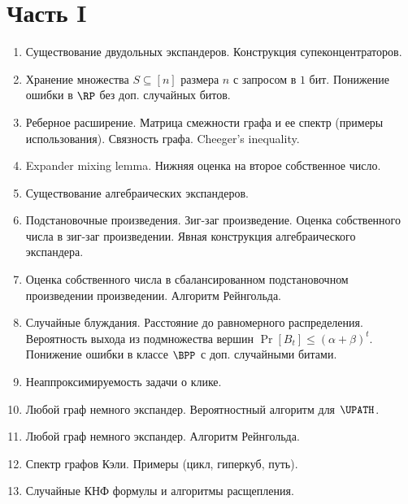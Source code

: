 





\section*{Часть I}
\begin{enumerate}
    \item Существование двудольных экспандеров. Конструкция супеконцентраторов.
    \item Хранение множества $S \subseteq [n]$ размера $n$ с запросом в $1$ бит. Понижение ошибки в $\RP$
        без доп. случайных битов.
    \item Реберное расширение. Матрица смежности графа и ее спектр (примеры использования). Связность
        графа. Cheeger's inequality.
    \item Expander mixing lemma. Нижняя оценка на второе собственное число.
    \item Существование алгебраических экспандеров.
    \item Подстановочные произведения. Зиг-заг произведение. Оценка собственного числа в зиг-заг произведении. Явная
        конструкция алгебраического экспандера.
    \item Оценка собственного числа в сбалансированном подстановочном произведении произведении.
        Алгоритм Рейнгольда.
    \item Случайные блуждания. Расстояние до равномерного распределения. Вероятность выхода из
        подмножества вершин $\Pr[B_t] \le (\alpha + \beta)^t$. Понижение ошибки в классе $\BPP$ с
        доп. случайными битами.
    \item Неаппроксимируемость задачи о клике.
    \item Любой граф немного экспандер. Вероятностный алгоритм для $\UPATH$.
    \item Любой граф немного экспандер. Алгоритм Рейнгольда.
    \item Спектр графов Кэли. Примеры (цикл, гиперкуб, путь).
    \item Случайные КНФ формулы и алгоритмы расщепления.
\end{enumerate}

